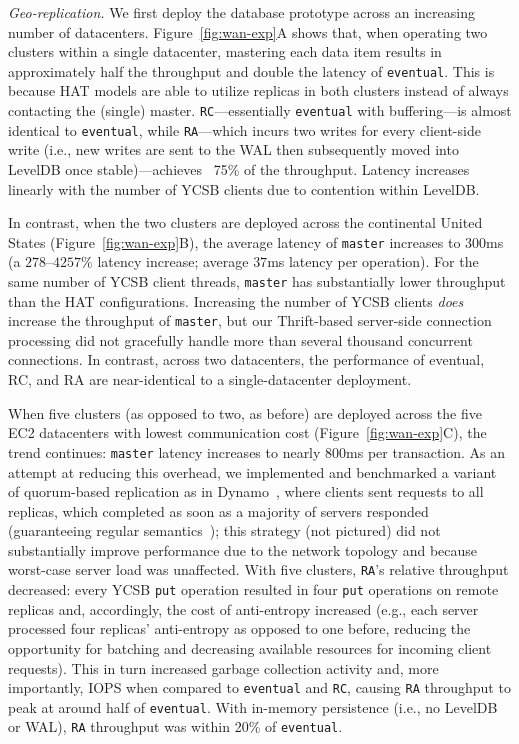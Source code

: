 \vspace{.5em}\noindent\textit{Geo-replication.} We first deploy the
database prototype across an increasing number of
datacenters. Figure~\ref{fig:wan-exp}A shows that, when operating two
clusters within a single datacenter, mastering each data item results
in approximately half the throughput and double the latency of
\texttt{eventual}. This is because HAT models are able to utilize
replicas in both clusters instead of always contacting the (single)
master. \texttt{RC}---essentially \texttt{eventual} with
buffering---is almost identical to \texttt{eventual}, while
\texttt{RA}---which incurs two writes for every client-side write
(i.e., new writes are sent to the WAL then subsequently moved into
LevelDB once stable)---achieves ~75\% of the throughput. Latency
increases linearly with the number of YCSB clients due to contention
within LevelDB.

In contrast, when the two clusters are deployed across the continental
United States (Figure~\ref{fig:wan-exp}B), the average latency of
\texttt{master} increases to $300$ms (a $278$--$4257\%$ latency
increase; average $37$ms latency per operation). For the same number
of YCSB client threads, \texttt{master} has substantially lower
throughput than the HAT configurations. Increasing the number of YCSB
clients \textit{does} increase the throughput of \texttt{master}, but
our Thrift-based server-side connection processing did not gracefully
handle more than several thousand concurrent connections. In contrast,
across two datacenters, the performance of eventual, RC, and RA are
near-identical to a single-datacenter deployment.

When five clusters (as opposed to two, as before) are deployed across
the five EC2 datacenters with lowest communication cost
(Figure~\ref{fig:wan-exp}C), the trend continues: \texttt{master}
latency increases to nearly $800$ms per transaction. As an attempt at
reducing this overhead, we implemented and benchmarked a variant of
quorum-based replication as in Dynamo~\cite{dynamo}, where clients
sent requests to all replicas, which completed as soon as a majority
of servers responded (guaranteeing regular
semantics~\cite{herlihy-art}); this strategy (not pictured) did not
substantially improve performance due to the network topology and
because worst-case server load was unaffected. With five clusters,
\texttt{RA}'s relative throughput decreased: every YCSB \texttt{put}
operation resulted in four \texttt{put} operations on remote replicas
and, accordingly, the cost of anti-entropy increased (e.g., each
server processed four replicas' anti-entropy as opposed to one before,
reducing the opportunity for batching and decreasing available
resources for incoming client requests). This in turn increased
garbage collection activity and, more importantly, IOPS when compared
to \texttt{eventual} and \texttt{RC}, causing \texttt{RA} throughput
to peak at around half of \texttt{eventual}. With in-memory
persistence (i.e., no LevelDB or WAL), \texttt{RA} throughput was
within 20\% of \texttt{eventual}.


